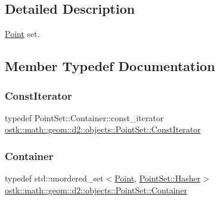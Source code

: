 \subsection{Detailed Description}
\hyperlink{classostk_1_1math_1_1geom_1_1d2_1_1objects_1_1_point}{Point} set. 

\subsection{Member Typedef Documentation}
\mbox{\label{classostk_1_1math_1_1geom_1_1d2_1_1objects_1_1_point_set_a6a0613cc686e9247430658eee91036d0}} 
\subsubsection{\texorpdfstring{Const\+Iterator}{ConstIterator}}
{\footnotesize\ttfamily typedef Point\+Set\+::\+Container\+::const\+\_\+iterator \hyperlink{classostk_1_1math_1_1geom_1_1d2_1_1objects_1_1_point_set_a6a0613cc686e9247430658eee91036d0}{ostk\+::math\+::geom\+::d2\+::objects\+::\+Point\+Set\+::\+Const\+Iterator}}

\mbox{\label{classostk_1_1math_1_1geom_1_1d2_1_1objects_1_1_point_set_ac65ec2015127166d3aa98b163e2a7199}} 
\subsubsection{\texorpdfstring{Container}{Container}}
{\footnotesize\ttfamily typedef std\+::unordered\+\_\+set$<$\hyperlink{classostk_1_1math_1_1geom_1_1d2_1_1objects_1_1_point}{Point}, \hyperlink{structostk_1_1math_1_1geom_1_1d2_1_1objects_1_1_point_set_1_1_hasher}{Point\+Set\+::\+Hasher}$>$ \hyperlink{classostk_1_1math_1_1geom_1_1d2_1_1objects_1_1_point_set_ac65ec2015127166d3aa98b163e2a7199}{ostk\+::math\+::geom\+::d2\+::objects\+::\+Point\+Set\+::\+Container}}



